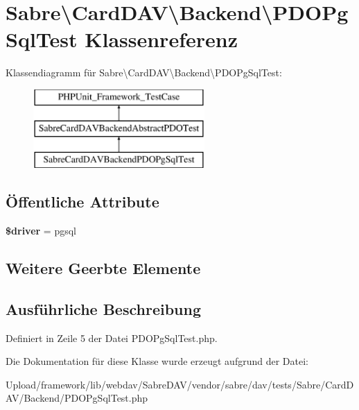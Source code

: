 \hypertarget{class_sabre_1_1_card_d_a_v_1_1_backend_1_1_p_d_o_pg_sql_test}{}\section{Sabre\textbackslash{}Card\+D\+AV\textbackslash{}Backend\textbackslash{}P\+D\+O\+Pg\+Sql\+Test Klassenreferenz}
\label{class_sabre_1_1_card_d_a_v_1_1_backend_1_1_p_d_o_pg_sql_test}
Klassendiagramm für Sabre\textbackslash{}Card\+D\+AV\textbackslash{}Backend\textbackslash{}P\+D\+O\+Pg\+Sql\+Test\+:\begin{figure}[H]
\begin{center}
\leavevmode
\includegraphics[height=3.000000cm]{class_sabre_1_1_card_d_a_v_1_1_backend_1_1_p_d_o_pg_sql_test}
\end{center}
\end{figure}
\subsection*{Öffentliche Attribute}
\begin{DoxyCompactItemize}
\item 
\mbox{\label{class_sabre_1_1_card_d_a_v_1_1_backend_1_1_p_d_o_pg_sql_test_ae47560ffe6b744940e37e1ca19265ab4}} 
{\bfseries \$driver} = \textquotesingle{}pgsql\textquotesingle{}
\end{DoxyCompactItemize}
\subsection*{Weitere Geerbte Elemente}


\subsection{Ausführliche Beschreibung}


Definiert in Zeile 5 der Datei P\+D\+O\+Pg\+Sql\+Test.\+php.



Die Dokumentation für diese Klasse wurde erzeugt aufgrund der Datei\+:\begin{DoxyCompactItemize}
\item 
Upload/framework/lib/webdav/\+Sabre\+D\+A\+V/vendor/sabre/dav/tests/\+Sabre/\+Card\+D\+A\+V/\+Backend/P\+D\+O\+Pg\+Sql\+Test.\+php\end{DoxyCompactItemize}
